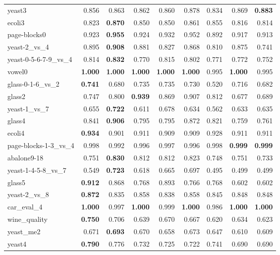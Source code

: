 \begin{table}[!htbp]
{\begin{tabular}{lrrrrrrrr}
			yeast3 & 0.856 & 0.863 & 0.862 & 0.860 & 0.878 & 0.834 & 0.869 & \textbf{0.883} \\
			ecoli3 & 0.823 & \textbf{0.870} & 0.850 & 0.850 & 0.861 & 0.855 & 0.816 & 0.814 \\
			page-blocks0 & 0.923 & \textbf{0.955} & 0.924 & 0.932 & 0.952 & 0.892 & 0.917 & 0.913 \\
			yeast-2\_vs\_4 & 0.895 & \textbf{0.908} & 0.881 & 0.827 & 0.868 & 0.810 & 0.875 & 0.741 \\
			yeast-0-5-6-7-9\_vs\_4 & 0.814 & \textbf{0.832} & 0.770 & 0.815 & 0.802 & 0.771 & 0.772 & 0.752 \\
			vowel0 & \textbf{1.000} & \textbf{1.000} & \textbf{1.000} & \textbf{1.000} & \textbf{1.000} & 0.995 & \textbf{1.000} & 0.995 \\
			glass-0-1-6\_vs\_2 & \textbf{0.741} & 0.680 & 0.735 & 0.735 & 0.730 & 0.520 & 0.716 & 0.682 \\
			glass2 & 0.747 & 0.800 & \textbf{0.939} & 0.869 & 0.907 & 0.812 & 0.677 & 0.689 \\
			yeast-1\_vs\_7 & 0.655 & \textbf{0.722} & 0.611 & 0.678 & 0.634 & 0.562 & 0.633 & 0.635 \\
			glass4 & 0.841 & \textbf{0.906} & 0.795 & 0.795 & 0.872 & 0.821 & 0.759 & 0.761 \\
			ecoli4 & \textbf{0.934} & 0.901 & 0.911 & 0.909 & 0.909 & 0.928 & 0.911 & 0.911 \\
			page-blocks-1-3\_vs\_4 & 0.998 & 0.992 & 0.996 & 0.997 & 0.996 & 0.998 & \textbf{0.999} & \textbf{0.999} \\
			abalone9-18 & 0.751 & \textbf{0.830} & 0.812 & 0.812 & 0.823 & 0.748 & 0.751 & 0.733 \\
			yeast-1-4-5-8\_vs\_7 & 0.549 & \textbf{0.723} & 0.618 & 0.665 & 0.697 & 0.495 & 0.499 & 0.499 \\
			glass5 & \textbf{0.912} & 0.868 & 0.768 & 0.893 & 0.766 & 0.768 & 0.602 & 0.602 \\
			yeast-2\_vs\_8 & \textbf{0.872} & 0.835 & 0.858 & 0.838 & 0.858 & 0.845 & 0.848 & 0.848 \\
			car\_eval\_4 & \textbf{1.000} & 0.997 & \textbf{1.000} & 0.999 & \textbf{1.000} & 0.986 & \textbf{1.000} & \textbf{1.000} \\
			wine\_quality & \textbf{0.750} & 0.706 & 0.639 & 0.670 & 0.667 & 0.620 & 0.634 & 0.623 \\
			yeast\_me2 & 0.671 & \textbf{0.693} & 0.670 & 0.658 & 0.673 & 0.647 & 0.610 & 0.609 \\
			yeast4 & \textbf{0.790} & 0.776 & 0.732 & 0.725 & 0.722 & 0.741 & 0.690 & 0.690 \\

\end{tabular}}
\end{table}
